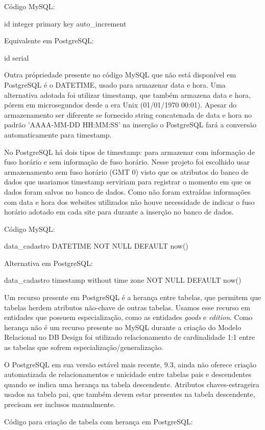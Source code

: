 \documentclass[12pt]{article}
\begin{document}
Código MySQL:

id integer primary key auto\_increment

Equivalente em PostgreSQL:

id serial

Outra própriedade presente no código MySQL que não está disponível em PostgreSQL é o DATETIME, usado para armazenar data e hora. Uma alternativa adotada foi utilizar timestamp, que também armazena data e hora, pórem em microsegundos desde a era Unix (01/01/1970 00:01). Apesar do armazenamento ser diferente se fornecido string concatenada de data e hora no padrão 'AAAA-MM-DD HH:MM:SS' na inserção o PostgreSQL fará a conversão automaticamente para timestamp. 

No PostgreSQL há dois tipos de timestamp: para armazenar com informação de fuso horário e sem informação de fuso horário. Nesse projeto foi escolhido usar armazenamento sem fuso horário (GMT 0) visto que os atributos do banco de dados que usariamos timestamp serviriam para registrar o momento em que os dados foram salvos no banco de dados. Como não foram extraídas informações com data e hora dos websites utilizados não houve necessidade de indicar o fuso horário adotado em cada site para durante a inserção no banco de dados.

Código MySQL:

data\_cadastro DATETIME NOT NULL DEFAULT now()

Alternativa em PostgreSQL:

data\_cadastro timestamp without time zone NOT NULL DEFAULT now()


Um recurso presente em PostgreSQL é a herança entre tabelas, que permitem que tabelas herdem atributos não-chave de outras tabelas. Usamos esse recurso em entidades que possuem especialização, como as entidades \textit{goods} e \textit{edition}. Como herança não é um recurso presente no MySQL durante a criação do Modelo Relacional no DB Design foi utilizado relacionamento de cardinalidade 1:1 entre as tabelas que sofrem especialização/generalização.

O PostgreSQL em sua versão estável mais recente, 9.3, ainda não oferece criação automatizada de relacionamentos e unicidade entre tabelas pais e descendentes quando se indica uma herança na tabela descendente. Atributos chaves-estrageira usados na tabela pai, que também devem estar presentes na tabela descendente, precisam ser inclusos manualmente.

Código para criação de tabela com herança em PostgreSQL:
\end{document}
